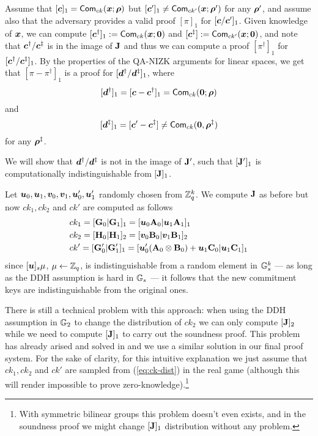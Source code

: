 Assume that $[{\boldsymbol{c}}]_1 = \mathsf{Com}_{ck}({\boldsymbol{x}};{\boldsymbol{\rho}})$ but $[{\boldsymbol{c}}']_1\neq \mathsf{Com}_{ck'}({\boldsymbol{x}};{\boldsymbol{\rho}}')$ for any ${\boldsymbol{\rho}}'$, and assume also that the adversary provides a valid proof $[\pi]_1$ for $[{\boldsymbol{c}}/{\boldsymbol{c}}']_1$. Given knowledge of ${\boldsymbol{x}}$, we can compute $[{\boldsymbol{c}}^\dag]_1:=\mathsf{Com}_{ck}({\boldsymbol{x}};{\boldsymbol{0}})$ and $[{\boldsymbol{c}}^\ddag]:=\mathsf{Com}_{ck'}({\boldsymbol{x}};{\boldsymbol{0}})$, and note that ${\boldsymbol{c}}^\dag/{\boldsymbol{c}}^\ddag$ is in the image of $\mathbf{{J}}$ and thus we can compute a proof $[\pi^\dag]_1$ for $[{\boldsymbol{c}}^\dag/{\boldsymbol{c}}^\ddag]_1$. By the properties of the QA-NIZK arguments for linear spaces, we get that $[\pi-\pi^\dag]_1$ is a proof for $[{\boldsymbol{d}}^\dag/{\boldsymbol{d}}^\ddag]_1$, where
$$[{\boldsymbol{d}}^\dag]_1=[{\boldsymbol{c}}-{\boldsymbol{c}}^\dag]_1= \mathsf{Com}_{ck}({\boldsymbol{0}};{\boldsymbol{\rho}})$$ and 
$$[{\boldsymbol{d}}^\ddag]_1 = [{\boldsymbol{c}}'-{\boldsymbol{c}}^\ddag]\neq\mathsf{Com}_{ck}({\boldsymbol{0}},{\boldsymbol{\rho}}^\ddag)$$ for any ${\boldsymbol{\rho}}^\ddag$.

We will show that ${\boldsymbol{d}}^\dag/ {\boldsymbol{d}}^\ddag$ is not in the image of $\mathbf{{J}}'$, such that $[\mathbf{{J}}']_1$ is computationally indistinguishable from $[\mathbf{{J}}]_1$.

Let ${\boldsymbol{u}}_0,{\boldsymbol{u}}_1,{\boldsymbol{v}}_0,{\boldsymbol{v}}_1,{\boldsymbol{u}}'_0,{\boldsymbol{u}}'_1$ randomly chosen from $\mathbb{Z}_q^k$. We compute $\mathbf{{J}}$ as before but now $ck_1,ck_2$ and $ck'$ are computed as follows
\begin{align}
&ck_1 = [\mathbf{{G}}_0|\mathbf{{G}}_1]_1 = [{\boldsymbol{u}}_0\mathbf{{A}}_{0}|{\boldsymbol{u}}_1\mathbf{{A}}_1]_1 \nonumber \\
&ck_2 = [\mathbf{{H}}_0|\mathbf{{H}}_1]_2 = [{\boldsymbol{v}}_0\mathbf{{B}}_{0}|{\boldsymbol{v}}_1\mathbf{{B}}_1]_2 \nonumber \\
&ck' =  [\mathbf{{G}}'_0|\mathbf{{G}}'_1]_1 = [{\boldsymbol{u}}'_0(\mathbf{{A}}_0\otimes\mathbf{{B}}_0) + {\boldsymbol{u}}_1\mathbf{{C}}_0|{\boldsymbol{u}}_1\mathbf{{C}}_1]_1 \label{eq:ck-dist}
\end{align}
since $[{\boldsymbol{u}}]_s\mu$, $\mu\gets \mathbb{Z}_q$, is indistinguishable from a random element in $\mathbb{G}_s^k$ --- as long as the DDH assumption is hard in $\mathbb{G}_s$ --- it follows that the new commitment keys are indistinguishable from the original ones.

There is still a technical problem with this approach: when using the DDH assumption in $\mathbb{G}_2$ to change the distribution of $ck_2$ we can only compute $[\mathbf{{J}}]_2$ while we need to compute $[\mathbf{{J}}]_1$ to carry out the soundness proof. This problem has already arised and solved in \cite{AC:GonHevRaf15} and we use a similar solution in our final proof system. For the sake of clarity, for this intuitive explanation we just assume that $ck_1,ck_2$ and $ck'$ are sampled from (\ref{eq:ck-dist}) in the real game (although this will render impossible to prove zero-knowledge).\footnote{With symmetric bilinear groups this problem doesn't even exists, and in the soundness proof we might change $[\mathbf{{J}}]_1$ distribution without any problem.}


